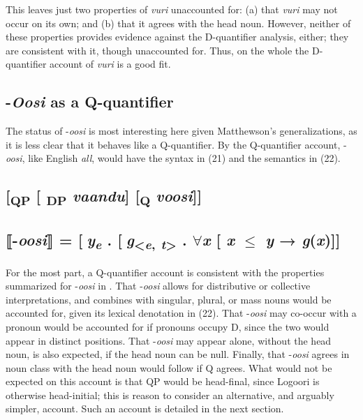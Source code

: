 \documentclass[output=paper]{langsci/langscibook}
\begin{document}
  This leaves just two properties of \textit{vuri} unaccounted for: (a) that \textit{vuri} may not occur on its own; and (b) that it agrees with the head noun. However, neither of these properties provides evidence against the D-quantifier analysis, either; they are consistent with it, though unaccounted for. Thus, on the whole the D-quantifier account of \textit{vuri} is a good fit.

\subsection{{}-\textit{Oosi} as a Q-quantifier}

The status of -\textit{oosi} is most interesting here given Matthewson's generalizations, as it is less clear that\textit{} it behaves like a Q-quantifier. By the Q-quantifier account, -\textit{oosi}, like English \textit{all}, would have the syntax in (21) and the semantics in (22).

\subsection{      [\textsubscript{QP} [\textsubscript{ DP} \textit{vaandu}] [\textsubscript{Q} \textit{voosi}]]}
\subsection{      ⟦{}-\textit{oosi}⟧ = [\textit{y}\textit{\textsubscript{e}} . [\textit{g}\textsubscript{<}\textit{\textsubscript{e}}\textsubscript{,} \textit{\textsubscript{t}}\textsubscript{>}\textit{}  . ${\forall}$\textit{x} [ \textit{x} ${\leq}$\textit{ y} → \textit{g}(\textit{x})]]}

For the most part, a Q-quantifier account is consistent with the properties summarized for -\textit{oosi} in . That -\textit{oosi} allows for distributive or collective interpretations, and combines with singular, plural, or mass nouns would be accounted for, given its lexical denotation in (22). That -\textit{oosi} may co-occur with a pronoun would be accounted for if pronouns occupy D, since the two would appear in distinct positions. That -\textit{oosi} may appear alone, without the head noun, is also expected, if the head noun can be null. Finally, that -\textit{oosi} agrees in noun class with the head noun would follow if Q agrees. What would not be expected on this account is that QP would be head-final, since Logoori is otherwise head-initial; this is reason to consider an alternative, and arguably simpler, account. Such an account is detailed in the next section.
\end{document}
